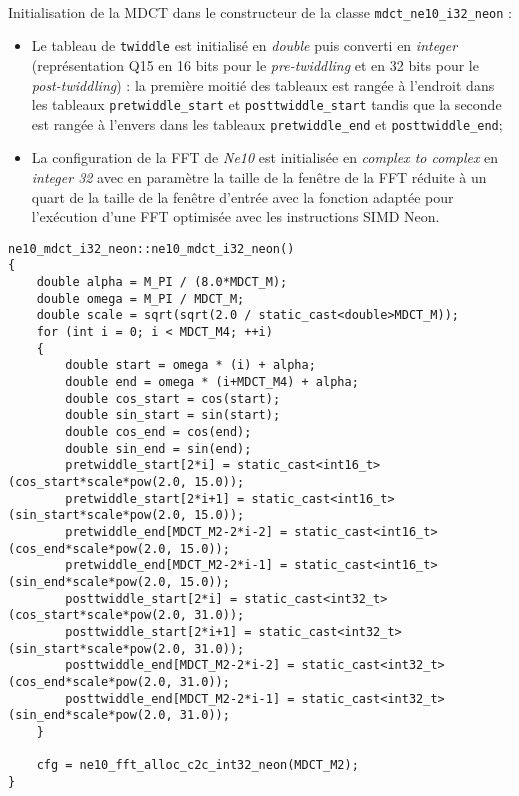 \documentclass{article}
\begin{document}
\paragraph{}
Initialisation de la MDCT dans le constructeur de la classe \texttt{mdct\_ne10\_i32\_neon} :
\begin{itemize}
    \item Le tableau de \texttt{twiddle} est initialisé en \emph{double} puis converti en \emph{integer} (représentation Q15 en 16 bits pour le \emph{pre-twiddling} et en 32 bits pour le \emph{post-twiddling}) : la première moitié des tableaux est rangée à l'endroit dans les tableaux \texttt{pretwiddle\_start} et \texttt{posttwiddle\_start} tandis que la seconde est rangée à l'envers dans les tableaux \texttt{pretwiddle\_end} et \texttt{posttwiddle\_end};
    \item La configuration de la FFT de \emph{Ne10} est initialisée en \emph{complex to complex} en \emph{integer 32} avec en paramètre la taille de la fenêtre de la FFT réduite à un quart de la taille de la fenêtre d'entrée avec la fonction adaptée pour l'exécution d'une FFT optimisée avec les instructions SIMD Neon.
\end{itemize}
\newpage
\lstset{language=C++}
\begin{lstlisting}
ne10_mdct_i32_neon::ne10_mdct_i32_neon()
{
    double alpha = M_PI / (8.0*MDCT_M);
    double omega = M_PI / MDCT_M;
    double scale = sqrt(sqrt(2.0 / static_cast<double>MDCT_M));
    for (int i = 0; i < MDCT_M4; ++i)
    {
        double start = omega * (i) + alpha;
        double end = omega * (i+MDCT_M4) + alpha;
        double cos_start = cos(start);
        double sin_start = sin(start);
        double cos_end = cos(end);
        double sin_end = sin(end);
        pretwiddle_start[2*i] = static_cast<int16_t>(cos_start*scale*pow(2.0, 15.0));
        pretwiddle_start[2*i+1] = static_cast<int16_t>(sin_start*scale*pow(2.0, 15.0));
        pretwiddle_end[MDCT_M2-2*i-2] = static_cast<int16_t>(cos_end*scale*pow(2.0, 15.0));
        pretwiddle_end[MDCT_M2-2*i-1] = static_cast<int16_t>(sin_end*scale*pow(2.0, 15.0));
        posttwiddle_start[2*i] = static_cast<int32_t>(cos_start*scale*pow(2.0, 31.0));
        posttwiddle_start[2*i+1] = static_cast<int32_t>(sin_start*scale*pow(2.0, 31.0));
        posttwiddle_end[MDCT_M2-2*i-2] = static_cast<int32_t>(cos_end*scale*pow(2.0, 31.0));
        posttwiddle_end[MDCT_M2-2*i-1] = static_cast<int32_t>(sin_end*scale*pow(2.0, 31.0));
    }

    cfg = ne10_fft_alloc_c2c_int32_neon(MDCT_M2);
}
\end{lstlisting}
\end{document}
